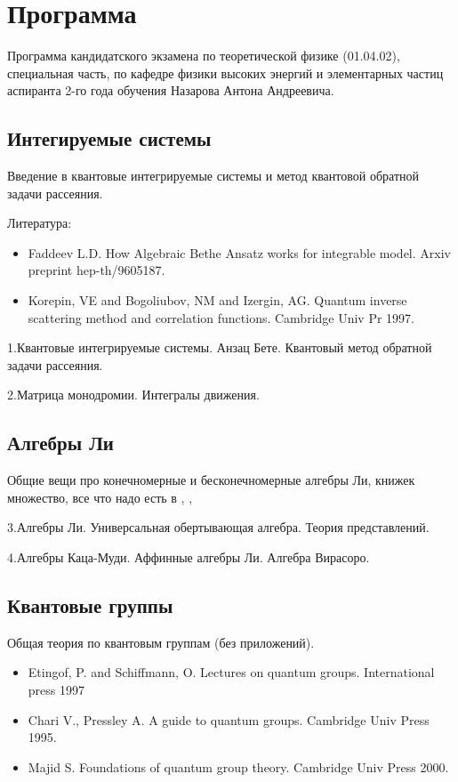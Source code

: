 \documentclass[a4paper,12pt]{article}
\theoremstyle{definition} \newtheorem{Def}{Definition}
\begin{document}
\section{Программа}
Программа кандидатского экзамена по теоретической физике (01.04.02), специальная
часть, по кафедре физики высоких энергий и элементарных частиц
аспиранта 2-го года обучения Назарова Антона Андреевича.

\subsection{Интегируемые системы}
\label{sec:-}

Введение в квантовые интегрируемые системы и метод квантовой обратной задачи рассеяния. 

Литература:
  \begin{itemize}
  \item Faddeev L.D. How Algebraic Bethe Ansatz works for integrable model. Arxiv preprint hep-th/9605187.
  \item Korepin, VE and Bogoliubov, NM and Izergin, AG. Quantum inverse scattering method and correlation functions. Cambridge Univ Pr 1997.
  \end{itemize}


1.Квантовые интегрируемые системы. Анзац Бете. Квантовый метод обратной задачи рассеяния.

2.Матрица монодромии. Интегралы движения.


\subsection{Алгебры Ли}
\label{sec:Lie}
Общие вещи про конечномерные и бесконечномерные алгебры Ли, книжек множество, все что надо есть в 
 \cite{kac1988modular}, \cite{difrancesco1997cft}, 

3.Алгебры Ли. Универсальная обертывающая алгебра. Теория представлений.

4.Алгебры Каца-Муди. Аффинные алгебры Ли. Алгебра Вирасоро.

\subsection{Квантовые группы}
\label{sec:Quantum-groups}

Общая теория по квантовым группам (без приложений).
  \begin{itemize}
  \item Etingof, P. and Schiffmann, O. Lectures on quantum groups. International press 1997
  \item Chari V., Pressley A. A guide to quantum groups. Cambridge Univ Press 1995.
  \item Majid S. Foundations of quantum group theory. Cambridge Univ Press 2000.
  \end{itemize}
\end{document}
